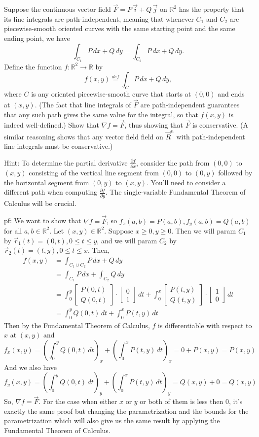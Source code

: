 \documentclass[11pt,letterpaper,cm]{nupset}
\newcommand{\bmat}[1]{\begin{bmatrix} #1 \end{bmatrix}}
\begin{document}
\begin{problem}[Exercise 5] Suppose the continuous vector field $\vec{F} = P\,\vec{i}+Q\,\vec{j}$ on $\mathbb{R}^2$ has the property that its line integrals are path-independent, meaning that whenever $C_1$ and $C_2$ are piecewise-smooth oriented curves with the same starting point and the same ending point, we have $$\int_{C_1} P\,dx+Q\,dy = \int_{C_2} P\,dx+Q\,dy.$$
	Define the function $f: \mathbb{R}^2 \to \mathbb{R}$ by
	$$f(x,y) \stackrel{def}{=} \int_{C} P\,dx+Q\,dy,$$
	where $C$ is any oriented piecewise-smooth curve that starts at $(0,0)$ and ends at $(x,y)$. (The fact that line integrals of $\vec{F}$ are path-independent guarantees that any such path gives the same value for the integral, so that $f(x,y)$ is indeed well-defined.) Show that $\nabla f = \vec{F}$, thus showing that $\vec{F}$ is conservative. (A similar reasoning shows that any vector field field on $\vec{R}^n$ with path-independent line integrals must be conservative.)
	\medskip
	
	Hint: To determine the partial derivative $\frac{\partial f}{\partial x}$, consider the path from $(0,0)$ to $(x,y)$ consisting of the vertical line segment from $(0,0)$ to $(0,y)$ followed by the horizontal segment from $(0,y)$ to $(x,y)$. You'll need to consider a different path when computing $\frac{\partial f}{\partial y}$. The single-variable Fundamental Theorem of Calculus will be crucial.
\end{problem}
\begin{solution}
	pf: We want to show that $\nabla f = \vec{F}$, so $f_x(a,b)=P(a,b),f_y(a,b)=Q(a,b)$ for all $a,b\in\mathbb{R}^2$. Let $(x,y)\in\mathbb{R}^2$. Suppose $x\geq 0,y\geq 0$. Then we will param $C_1$ by $\vec{r}_1(t)=(0,t),0\leq t\leq y$, and we will param $C_2$ by $\vec{r}_2(t)=(t,y),0\leq t\leq x$. Then,
	\begin{align*}
		f(x,y)&=\int_{C_1\cup C_2} P\, dx+Q\, dy\\
		&=\int_{C_1}P\, dx+\int_{C_2}Q\, dy\\
		&=\int_0^y \bmat{P(0,t)\\Q(0,t)}\cdot\bmat{0\\1}\,dt+\int_0^x \bmat{P(t,y)\\Q(t,y)}\cdot\bmat{1\\0}\,dt\\
		&=\int_0^y Q(0,t)\, dt+\int_0^x P(t,y)\, dt
	\end{align*}
	Then by the Fundamental Theorem of Calculus, $f$ is differentiable with respect to $x$ at $(x,y)$ and 
	$$f_x(x,y)=(\int_0^y Q(0,t)\, dt)_x+(\int_0^x P(t,y)\, dt)_x=0+P(x,y)=P(x,y)$$
	And we also have
	$$f_y(x,y)=(\int_0^y Q(0,t)\, dt)_y+(\int_0^x P(t,y)\, dt)_y=Q(x,y)+0=Q(x,y)$$ 
	So, $\nabla f = \vec{F}$. For the case when either $x$ or $y$ or both of them is less then 0, it's exactly the same proof but changing the parametrization and the bounds for the parametrization which will also give us the same result by applying the Fundamental Theorem of Calculus. 
\end{solution}
\newpage
\end{document}
